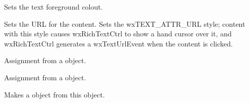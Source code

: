 
Sets the text foreground colout.

\label{wxrichtextattrseturl}


Sets the URL for the content. Sets the wxTEXT\_ATTR\_URL style; content with this style
causes wxRichTextCtrl to show a hand cursor over it, and wxRichTextCtrl generates
a wxTextUrlEvent when the content is clicked.

\label{wxrichtextattroperatorassign}


Assignment from a  object.


Assignment from a  object.

\label{wxrichtextattrwxtextattrex}


Makes a  object from this object.

